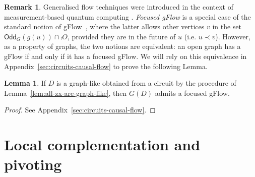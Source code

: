 \documentclass[a4paper,onecolumn,superscriptaddress,11pt,accepted=2020-04-27]{quantumarticle}
\newcommand{\odd}[2]{\textsf{Odd}_{#1}\left(#2\right)}
\newcommand{\UG}[1]{\ensuremath{G(#1)}\xspace}
\newcommand{\ket}[1]{\ensuremath{\left|  #1 \right\rangle}}
\theoremstyle{definition}
\newtheorem{lemma}[theorem]{Lemma}
\newtheorem{remark}[theorem]{Remark}
\newcommand{\NOTEr}[1]{\marginpar{\footnotesize {\color{magenta} \noindent\textbf{r:} #1}}}
\begin{document}
\begin{remark}\label{rem:focused-gflow-v-gflow}
  Generalised flow techniques were introduced in the context of measurement-based quantum computing \cite{Patterns,DKPP09}. \emph{Focused gFlow} is a special case of the standard notion of gFlow~\cite{GFlow}, where the latter allows other vertices $v$ in the set $\odd G {g(u)}\cap \comp O$, provided they are in the future of $u$ (i.e. $u \prec v$). However, as a property of graphs, the two notions are equivalent: an open graph has a gFlow if and only if it has a focused gFlow. We will rely on this equivalence in Appendix~\ref{sec:circuits-causal-flow} to prove the following Lemma.
\end{remark}

\begin{lemma}\label{lem:circuits-have-gflow}
  If $D$ is a graph-like \zxdiagram obtained from a circuit by the procedure of
  Lemma~\ref{lem:all-zx-are-graph-like}, then $\UG D$ admits a focused gFlow.
  \begin{proof}
    See Appendix~\ref{sec:circuits-causal-flow}.
  \end{proof}
\end{lemma}

\section{Local complementation and pivoting}\label{sec:lcomppivot}

\end{document}
